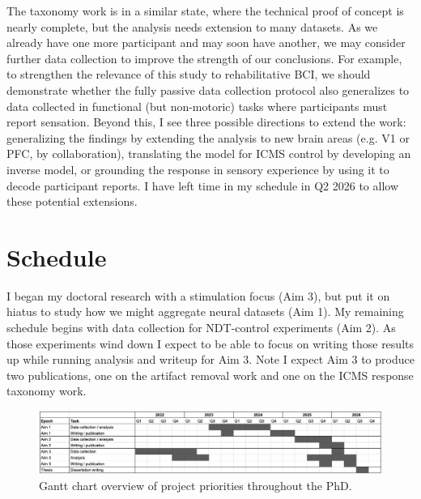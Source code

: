 \documentclass[12pt,oneside]{report}
\begin{document}
The taxonomy work is in a similar state, where the technical proof of concept is nearly complete, but the analysis needs extension to many datasets. As we already have one more participant and may soon have another, we may consider further data collection to improve the strength of our conclusions. For example, to strengthen the relevance of this study to rehabilitative BCI, we should demonstrate whether the fully passive data collection protocol also generalizes to data collected in functional (but non-motoric) tasks where participants must report sensation. Beyond this, I see three possible directions to extend the work: generalizing the findings by extending the analysis to new brain areas (e.g. V1 or PFC, by collaboration), translating the model for ICMS control by developing an inverse model, or grounding the response in sensory experience by using it to decode participant reports. I have left time in my schedule in Q2 2026 to allow these potential extensions.


\chapter{Schedule}
I began my doctoral research with a stimulation focus (Aim 3), but put it on hiatus to study how we might aggregate neural datasets (Aim 1). My remaining schedule begins with data collection for NDT-control experiments (Aim 2). As those experiments wind down I expect to be able to focus on writing those results up while running analysis and writeup for Aim 3. Note I expect Aim 3 to produce two publications, one on the artifact removal work and one on the ICMS response taxonomy work.

\begin{figure}[h]
  \centering
  \includegraphics[width=1.0\linewidth]{ch5_schedule_gantt.png}
  \caption{Gantt chart overview of project priorities throughout the PhD.}
  \label{fig:schedule}
\end{figure}

\cleardoublepage
\printbibliography
\end{document}
